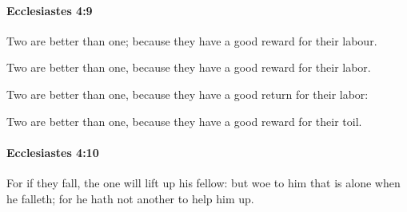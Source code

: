 		\paragraph{Ecclesiastes 4:9} %
			\label{ECCLESIASTES-4-9}

			Two are better than one; because they have a good reward for their labour.

			\begin{versebox}
					\item[BHS] 
					\item[LXX] 
					\item[ASV] Two are better than one, because they have a good reward for their labor.
					\item[NIV] Two are better than one, because they have a good return for their labor:
					\item[NRSV] Two are better than one, because they have a good reward for their toil.
			\end{versebox}

		\paragraph{Ecclesiastes 4:10} %
			\label{ECCLESIASTES-4-10}

			For if they fall, the one will lift up his fellow: but woe to him that is alone when he falleth; for he hath not another to help him up.

